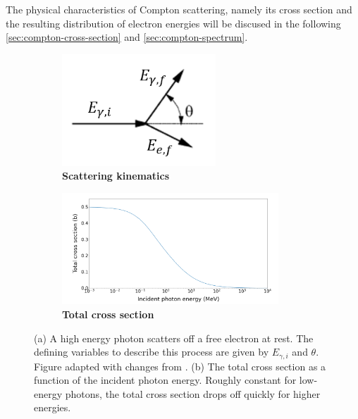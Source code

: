The physical characteristics of Compton scattering, namely its cross section and
the resulting distribution of electron energies will be discused in the following
\autoref{sec:compton-cross-section} and \autoref{sec:compton-spectrum}.

\begin{figure}
\centering
\begin{subfigure}[h]{0.5\linewidth}
\centering
\includegraphics[height=4.2cm]{fig/compton-scattering.png}
\caption{\textbf{Scattering kinematics}\label{fig:compton-scattering}}
\end{subfigure}%
\begin{subfigure}[h]{0.5\linewidth}
\centering
\includegraphics[height=4.2cm]{fig/compton-cross-section.png}
\caption{\textbf{Total cross section}\label{fig:compton-cross-section}}
\end{subfigure}%
\caption*{(a) A high energy photon scatters off a free electron at
rest. The defining variables to describe this process are given by $E_{\gamma,i}$
and $\theta$. Figure adapted with changes from \cite{Sch17}.
(b) The total cross section as a function of the incident photon energy.
Roughly constant for low-energy photons, the total cross section drops off quickly
for higher energies.}
\end{figure}

\newpage
